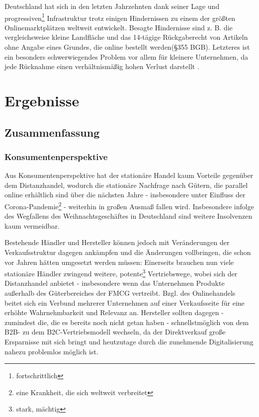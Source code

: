 \documentclass[a4paper, 12pt]{scrartcl}
\begin{document}
Deutschland hat sich in den letzten Jahrzehnten dank seiner Lage und progressiven\footnote{fortschrittlich} Infrastruktur trotz einigen Hindernissen zu einem der größten Onlinemarktplätzen weltweit entwickelt. Besagte Hindernisse sind z. B. die vergleichsweise kleine Landfläche und das 14-tägige Rückgaberecht von Artikeln ohne Angabe eines Grundes, die online bestellt werden(§355 BGB). Letzteres ist ein besonders schwerwiegendes Problem vor allem für kleinere Unternehmen, da jede Rücknahme einen verhältnismäßig hohen Verlust darstellt \cite{retourwahnsinn}.





        \newpage
        
        
        
    \section{Ergebnisse}
        \subsection{Zusammenfassung}
        
        
        
        
        
        \subsubsection{Konsumentenperspektive}
Aus Konsumentenperspektive hat der stationäre Handel kaum Vorteile gegenüber dem Distanzhandel, wodurch die stationäre Nachfrage nach Gütern, die parallel online erhältlich sind über die nächsten Jahre - insbesondere unter Einfluss der Corona-Pandemie\footnote{eine Krankheit, die sich weltweit verbreitet} - weiterhin in großen Ausmaß fallen wird. Insbesondere infolge des Wegfallens des Weihnachtsgeschäftes in Deutschland sind weitere Insolvenzen kaum vermeidbar.

Bestehende Händler und Hersteller können jedoch mit Veränderungen der Verkaufsstruktur dagegen ankämpfen und die Änderungen vollbringen, die schon vor Jahren hätten umgesetzt werden müssen: Einerseits brauchen nun viele stationäre Händler zwingend weitere, potente\footnote{stark, mächtig} Vertriebswege, wobei sich der Distanzhandel anbietet - insbesondere wenn das Unternehmen Produkte außerhalb des Güterbereiches der \ac{FMCG} vertreibt. Bzgl. des Onlinehandels beitet sich ein Verbund mehrerer Unternehmen auf einer Verkaufsseite für eine erhöhte Wahrnehmbarkeit und Relevanz an. Hersteller sollten dagegen - zumindest die, die es bereits noch nicht getan haben - schnellstmöglich von dem \ac{B2B}- zu dem \ac{B2C}-Vertriebsmodell wechseln, da der Direktverkauf große Ersparnisse mit sich bringt und heutzutage durch die zunehmende Digitalisierung nahezu problemlos möglich ist.
\end{document}
